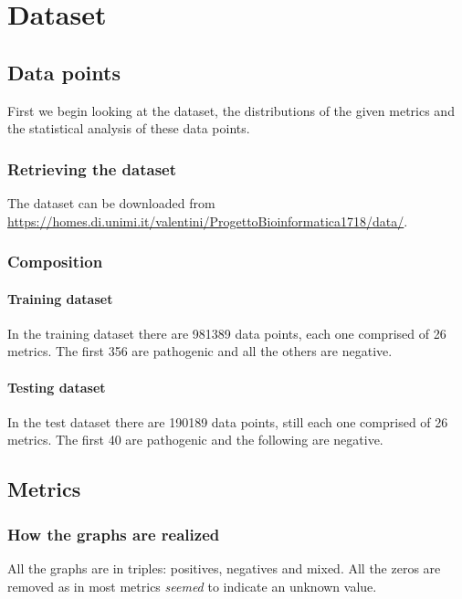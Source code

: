 \providecommand{\main}{.}

\usepackage{booktabs}




{\hypersetup{hidelinks}
	\tableofcontents  %
}
\part{Dataset}
\chapter{Data points}
First we begin looking at the dataset, the distributions of the given metrics and the statistical analysis of these data points.

\section{Retrieving the dataset}
The dataset can be downloaded from \url{https://homes.di.unimi.it/valentini/ProgettoBioinformatica1718/data/}.

\section{Composition}
\subsection{Training dataset}
In the training dataset there are 981389 data points, each one comprised of 26 metrics. The first 356 are pathogenic and all the others are negative.

\subsection{Testing dataset}
In the test dataset there are 190189 data points, still each one comprised of 26 metrics. The first 40 are pathogenic and the following are negative.

\chapter{Metrics}
\section{How the graphs are realized}
All the graphs are in triples: positives, negatives and mixed. All the zeros are removed as in most metrics \textit{seemed} to indicate an unknown value.

